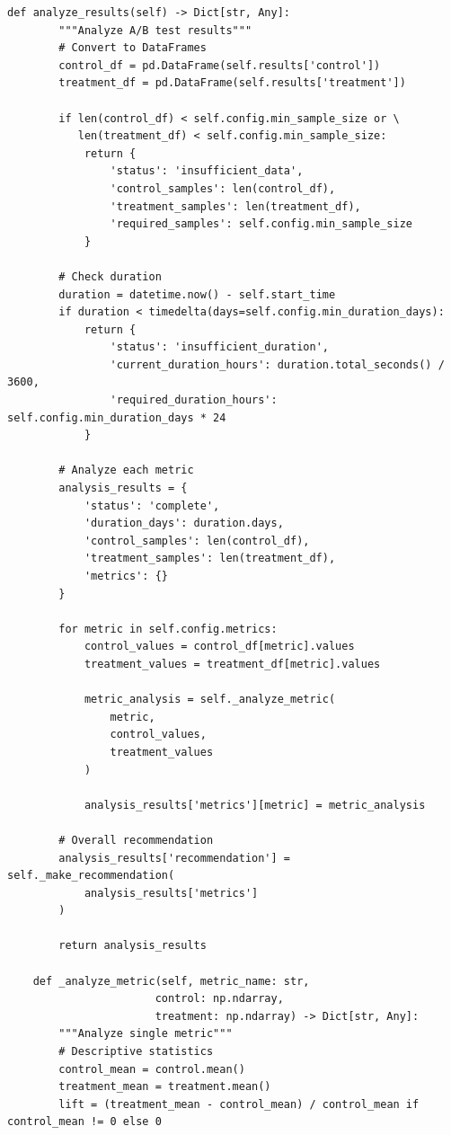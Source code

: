 \begin{lstlisting}[style=python, caption=Production A/B testing framework for ML models]
    def analyze_results(self) -> Dict[str, Any]:
        """Analyze A/B test results"""
        # Convert to DataFrames
        control_df = pd.DataFrame(self.results['control'])
        treatment_df = pd.DataFrame(self.results['treatment'])

        if len(control_df) < self.config.min_sample_size or \
           len(treatment_df) < self.config.min_sample_size:
            return {
                'status': 'insufficient_data',
                'control_samples': len(control_df),
                'treatment_samples': len(treatment_df),
                'required_samples': self.config.min_sample_size
            }

        # Check duration
        duration = datetime.now() - self.start_time
        if duration < timedelta(days=self.config.min_duration_days):
            return {
                'status': 'insufficient_duration',
                'current_duration_hours': duration.total_seconds() / 3600,
                'required_duration_hours': self.config.min_duration_days * 24
            }

        # Analyze each metric
        analysis_results = {
            'status': 'complete',
            'duration_days': duration.days,
            'control_samples': len(control_df),
            'treatment_samples': len(treatment_df),
            'metrics': {}
        }

        for metric in self.config.metrics:
            control_values = control_df[metric].values
            treatment_values = treatment_df[metric].values

            metric_analysis = self._analyze_metric(
                metric,
                control_values,
                treatment_values
            )

            analysis_results['metrics'][metric] = metric_analysis

        # Overall recommendation
        analysis_results['recommendation'] = self._make_recommendation(
            analysis_results['metrics']
        )

        return analysis_results

    def _analyze_metric(self, metric_name: str,
                       control: np.ndarray,
                       treatment: np.ndarray) -> Dict[str, Any]:
        """Analyze single metric"""
        # Descriptive statistics
        control_mean = control.mean()
        treatment_mean = treatment.mean()
        lift = (treatment_mean - control_mean) / control_mean if control_mean != 0 else 0


\end{lstlisting}
